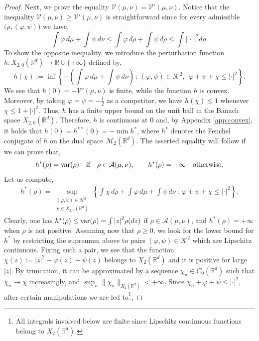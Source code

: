 \documentclass[11pt,letterpaper,reqno]{amsart}
\theoremstyle{definition}
\numberwithin{equation}{section}
\def\f{\varphi}
\newcommand{\R}{\mathbb{R}}
\newcommand{\ov}{\overline}
\newcommand{\A}{\mathcal{A}}
\newcommand{\K}{\mathcal{K}}
\newcommand{\var}{{\rm{var}}}
\newcommand{\argu}{{\,\cdot\,}}
\newcommand{\Mes}{{\mathcal{M}}}
\newcommand{\abs}[1]{{\left \lvert #1 \right \rvert}}
\newcommand{\C}{{C}}
\newcommand{\V}{{\mathcal{V}}}
\begin{document}
{\begin{proof}
Next, we prove the equality $ \V(\mu,\nu)  = \V'(\mu,\nu)$. Notice that the inequality  $ \V(\mu,\nu) \ge\V'(\mu,\nu)$ is straightforward since for every admissible $\big(\rho,(\f,\psi)\big)$ we have,
\begin{equation}\label{sup<inf}
		\int \varphi \, d\mu + \int \psi \,d\nu \leq  \int \varphi \, d\rho + \int \psi \,d\rho \leq \int \abs{\argu}^2 d\rho.
	\end{equation}
To show the opposite inequality, we introduce the perturbation function $h:X_{2,0}(\R^d) \to \R \cup \{+\infty\}$ defined by,
$$  h(\chi)  := \inf\left\{  -\left(\int \f\, d\mu + \int \psi\, d\nu\right) \, :\, (\f,\psi)\in \K^2 , \ \ \f +\psi + \chi \le |\cdot|^2 \right\}.$$	
We see that $h(0) = - \V'(\mu,\nu)$ is finite, while the function $h$ is convex. Moreover, by taking $\f=\psi= -\frac1{2}$ as a competitor, we have $  h(\chi) \le 1$  whenever \  $\chi\le 1 +|\cdot|^2  .$
Thus, $h$ has a finite upper bound on the unit ball in the Banach space $X_{2,0}(\R^d)$. Therefore, $h$ is continuous at $0$ and, by Appendix \ref{app:convex}, it holds that
$h(0)= h^{**}(0) = - \min h^*$, where $h^*$ denotes the Fenchel conjugate of $h$ on the dual space $\Mes_2(\R^d)$.
The asserted equality will follow if we can prove that,
\begin{equation}\label{claim:h^*}
 h^*(\rho)= \var(\rho)  \quad \text{if\quad$\rho\in\A(\mu,\nu)$}, \qquad  h^*(\rho) = +\infty  \quad \text{otherwise}.
 \end{equation}
Let us compute,
\begin{align*}  h^*(\rho) =  \sup_{\substack{(\f,\psi)\in \K^2 \\ \chi\in X_{2,0}(\R^d)}}  \left\{ \int \chi\, d\rho + \int \f\, d\mu + \int \psi\, d\nu \ :\   \f +\psi + \chi \le |\cdot|^2 \right\}.
\end{align*}
Clearly, one has $h^*(\rho) \le \var(\rho) = \int \abs{z}^2 \rho(dz)$ if $\rho\in\A(\mu,\nu)$, and $h^*(\rho) = +\infty$ when $\rho$ is not positive. Assuming now that $\rho \geq 0$, we look for the lower bound for $h^*$ by restricting the supremum above to pairs $(\f,\psi)\in \K^2$ which are Lipschitz continuous. Fixing such a pair, we see that the function $\ov \chi(z):= |z|^2 -\f(z)-\psi(z)$ belongs to $X_2(\R^d)$ and it is positive for large $|z|$.  By truncation, it  can be approximated by a sequence $\chi_n \in \C_0(\R^d)$ such that $\chi_n\to \ov \chi$ increasingly, and $\sup_n \|\chi_n\|_{X_2(\R^d)} <+\infty$. Since $\chi_n+\f+\psi\le |\cdot|^2$,
 after certain manipulations we are led to\footnote{All integrals involved below are finite since Lipschitz continuous functions belong to $X_2(\R^d)$.},

\end{proof}}
\end{document}
